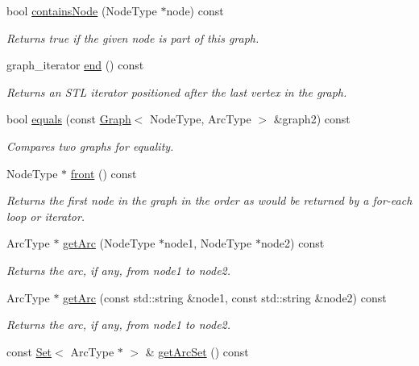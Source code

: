 \begin{DoxyCompactItemize}
bool \mbox{\hyperlink{classGraph_a4f540ebc07c4e46a0bb7fee76a93386c}{contains\+Node}} (Node\+Type $\ast$node) const
\begin{DoxyCompactList}\small\item\em Returns true if the given node is part of this graph. \end{DoxyCompactList}\item 
graph\+\_\+iterator \mbox{\hyperlink{classGraph_afcdf62cae5d7e50644957d66f886742d}{end}} () const
\begin{DoxyCompactList}\small\item\em Returns an S\+TL iterator positioned after the last vertex in the graph. \end{DoxyCompactList}\item 
bool \mbox{\hyperlink{classGraph_a6bec43eb3dfdf3d23eb328b406edf44a}{equals}} (const \mbox{\hyperlink{classGraph}{Graph}}$<$ Node\+Type, Arc\+Type $>$ \&graph2) const
\begin{DoxyCompactList}\small\item\em Compares two graphs for equality. \end{DoxyCompactList}\item 
Node\+Type $\ast$ \mbox{\hyperlink{classGraph_a7b7c2c1738f8e7faf84c54d7642992fa}{front}} () const
\begin{DoxyCompactList}\small\item\em Returns the first node in the graph in the order as would be returned by a for-\/each loop or iterator. \end{DoxyCompactList}\item 
Arc\+Type $\ast$ \mbox{\hyperlink{classGraph_a7c33db338f839ff9e3dafe4fe61c16fd}{get\+Arc}} (Node\+Type $\ast$node1, Node\+Type $\ast$node2) const
\begin{DoxyCompactList}\small\item\em Returns the arc, if any, from node1 to node2. \end{DoxyCompactList}\item 
Arc\+Type $\ast$ \mbox{\hyperlink{classGraph_a94d4badfc856b0d4530c37121efb9834}{get\+Arc}} (const std\+::string \&node1, const std\+::string \&node2) const
\begin{DoxyCompactList}\small\item\em Returns the arc, if any, from node1 to node2. \end{DoxyCompactList}\item 
const \mbox{\hyperlink{classSet}{Set}}$<$ Arc\+Type $\ast$ $>$ \& \mbox{\hyperlink{classGraph_a0690edaeae8d5256189ae2e8541788b5}{get\+Arc\+Set}} () const

\end{DoxyCompactItemize}
